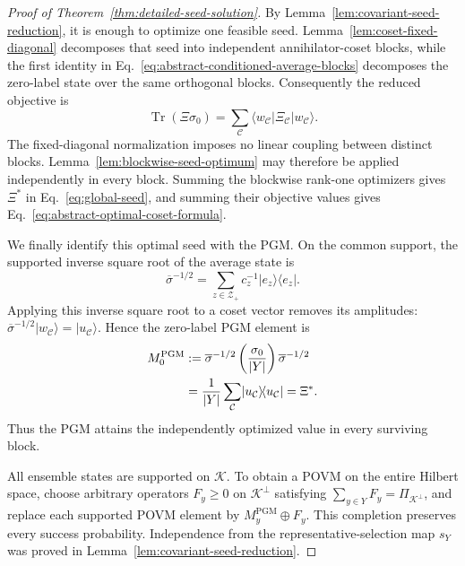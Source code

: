 \documentclass[11pt]{article}
\newcommand{\Tr}{\operatorname{Tr}}
\newcommand{\1}{\mathbf 1}
\newcommand{\PGM}{\mathrm{PGM}}
\newcommand{\ket}[1]{\lvert #1\rangle}
\newcommand{\bra}[1]{\langle #1\rvert}
\theoremstyle{plain}
\theoremstyle{definition}
\theoremstyle{remark}
\begin{document}
\begin{proof}[Proof of Theorem~\ref{thm:detailed-seed-solution}]
By Lemma~\ref{lem:covariant-seed-reduction}, it is enough to optimize one
feasible seed.  Lemma~\ref{lem:coset-fixed-diagonal} decomposes that seed into
independent annihilator-coset blocks, while the first identity in
Eq.~\eqref{eq:abstract-conditioned-average-blocks} decomposes the zero-label
state over the same orthogonal blocks.  Consequently the reduced objective is
\begin{equation}
 \Tr(\Xi\sigma_0)
 =\sum_{\mathcal C}
 \bra{w_{\mathcal C}}\Xi_{\mathcal C}\ket{w_{\mathcal C}}.
 \label{eq:abstract-seed-objective-block-decomposition}
\end{equation}
The fixed-diagonal normalization imposes no linear coupling between distinct
blocks.  Lemma~\ref{lem:blockwise-seed-optimum} may therefore be applied
independently in every block.  Summing the blockwise rank-one optimizers gives
$\Xi^*$ in Eq.~\eqref{eq:global-seed}, and summing their objective values gives
Eq.~\eqref{eq:abstract-optimal-coset-formula}.

We finally identify this optimal seed with the PGM.  On the common support,
the supported inverse square root of the average state is
\begin{equation}
 \overline\sigma^{-1/2}
 =\sum_{z\in\mathcal Z_+}c_z^{-1}
 \ket{e_z}\!\bra{e_z}.
 \label{eq:abstract-average-pseudoinverse}
\end{equation}
Applying this inverse square root to a coset vector removes its amplitudes:
$\overline\sigma^{-1/2}\ket{w_{\mathcal C}}
 =\ket{u_{\mathcal C}}$.  Hence the zero-label PGM element is
\begin{align}
 M_0^{\PGM}
 &:=\overline\sigma^{-1/2}
 \left(\frac{\sigma_0}{\lvert Y\rvert}\right)
 \overline\sigma^{-1/2}\notag\\
 &=\frac1{\lvert Y\rvert}\sum_{\mathcal C}
 \ket{u_{\mathcal C}}\!\bra{u_{\mathcal C}}
 =\Xi^*.
 \label{eq:pgm-equals-optimal}
\end{align}
Thus the PGM attains the independently optimized value in every surviving
block.

All ensemble states are supported on $\mathcal K$.  To obtain a POVM on the
entire Hilbert space, choose arbitrary operators $F_y\ge0$ on
$\mathcal K^\perp$ satisfying
$\sum_{y\in Y}F_y=\Pi_{\mathcal K^\perp}$, and replace each supported POVM
element by $M_y^{\PGM}\oplus F_y$.  This completion preserves every success
probability.  Independence from the representative-selection map $s_Y$ was
proved in Lemma~\ref{lem:covariant-seed-reduction}.
\end{proof}
\end{document}
